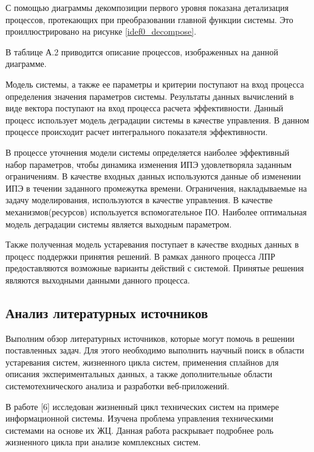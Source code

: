 С помощью диаграммы декомпозиции первого уровня показана детализация процессов, протекающих при преобразовании главной функции системы. Это проиллюстрировано на рисунке \ref{idef0_decompose}.

В таблице А.2 приводится описание процессов, изображенных на данной диаграмме.


Модель системы, а также ее параметры и критерии поступают на вход процесса определения значения параметров системы. 
Результаты данных вычислений в виде вектора поступают на вход процесса расчета эффективности. 
Данный процесс использует модель деградации системы в качестве управления. 
В данном процессе происходит расчет интегрального показателя эффективности. 

В процессе уточнения модели системы определяется наиболее эффективный набор параметров, чтобы динамика изменения ИПЭ удовлетворяла заданным ограничениям. 
В качестве входных данных используются данные об изменении ИПЭ в течении заданного промежутка времени. 
Ограничения, накладываемые на задачу моделирования, используются в качестве управления. 
В качестве механизмов(ресурсов) используется вспомогательное ПО. 
Наиболее оптимальная модель деградации системы является выходным параметром.

Также полученная модель устаревания поступает в качестве входных данных в процесс поддержки принятия решений. 
В рамках данного процесса ЛПР предоставляются возможные варианты действий с системой.
Принятые решения являются выходными данными данного процесса.

\subsection{Анализ литературных источников}

Выполним обзор литературных источников, которые могут помочь в решении поставленных задач. 
Для этого необходимо выполнить научный поиск в области устаревания систем, жизненного цикла систем, применения сплайнов для описания экспериментальных данных, а также дополнительные области системотехнического анализа и разработки веб-приложений.

В работе [6] исследован жизненный цикл технических систем на примере информационной системы. 
Изучена проблема управления техническими системами на основе их ЖЦ. 
Данная работа раскрывает подробнее роль жизненного цикла при анализе комплексных систем.

